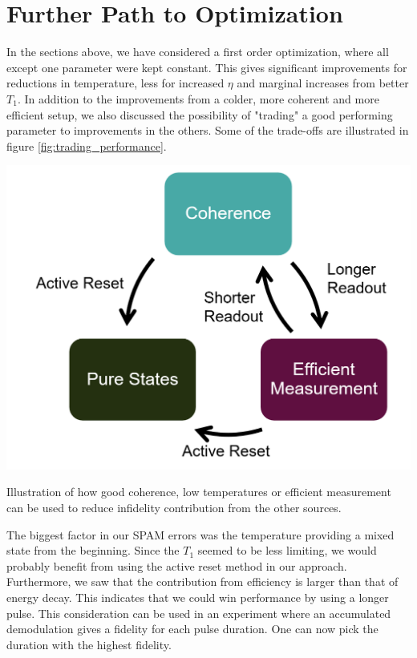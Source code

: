\section{Further Path to Optimization}
In the sections above, we have considered a first order optimization, where all except one parameter were kept constant. This gives significant improvements for reductions in temperature, less for increased $\eta$ and marginal increases from better $T_1$. In addition to the improvements from a colder, more coherent and more efficient setup, we also discussed the possibility of "trading" a good performing parameter to improvements in the others. Some of the trade-offs are illustrated in figure \ref{fig:trading_performance}. 

\begin{marginfigure}
    \centering
    \includegraphics[]{Figs/trading_parameters.png}
    \caption{Illustration of how good coherence, low temperatures or efficient measurement can be used to reduce infidelity contribution from the other sources. }
    \label{fig:trading_performance}
\end{marginfigure}

The biggest factor in our SPAM errors was the temperature providing a mixed state from the beginning. Since the $T_1$ seemed to be less limiting, we would probably benefit from using the active reset method in our approach. Furthermore, we saw that the contribution from efficiency is larger than that of energy decay. This indicates that we could win performance by using a longer pulse. This consideration can be used in an experiment where an accumulated demodulation gives a fidelity for each pulse duration. One can now pick the duration with the highest fidelity.

